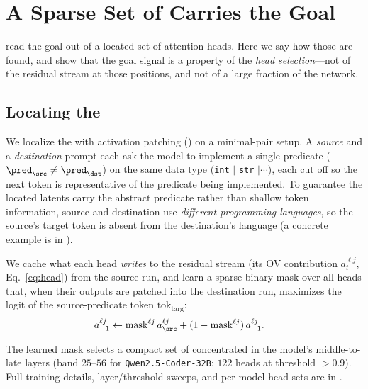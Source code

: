 \section{A Sparse Set of \goalheads Carries the Goal}
\label{sec:heads}

 read the goal out of a located set of attention heads. Here we say how those
\goalheads are found, and show that the goal signal is a property of the \emph{head selection}---not of
the residual stream at those positions, and not of a large fraction of the network.

\subsection{Locating the \goalheads}
\label{sec:heads:localize}

We localize the \goalheads with activation patching () on a
minimal-pair setup. A \emph{source} and a \emph{destination} prompt each ask the model to implement a
single predicate ($\pred_\src \neq \pred_\dst$) on the same data type (\texttt{int} $\mid$ \texttt{str}
$\mid \cdots$), each cut off so the next token is representative of the predicate being implemented. To
guarantee the located latents carry the abstract predicate rather than shallow token information, source
and destination use \emph{different programming languages}, so the source's target token is absent from
the destination's language (a concrete example is in {\color{red}}).

We cache what each head \emph{writes} to the residual stream (its OV contribution $a_t^{\ell j}$,
Eq.~\ref{eq:head}) from the source run, and learn a sparse binary mask over all heads that, when their
outputs are patched into the destination run, maximizes the logit of the source-predicate token
$\mathrm{tok}_\mathrm{targ}$:
\vspace{-1.0em}
\begin{align}
    \label{eqn:opt-int}
    a^{\ell j}_{-1} & \leftarrow \mathrm{mask}^{\ell j}\, a^{\ell j}_{\src} + (1 - \mathrm{mask}^{\ell j})\, a^{\ell j}_{-1}.
\end{align}
\vspace{-1.5em}

The learned mask selects a compact set of \goalheads concentrated in the model's middle-to-late layers
(band $25$--$56$ for \texttt{Qwen2.5-Coder-32B}; $122$ heads at threshold $>0.9$). Full training details,
layer/threshold sweeps, and per-model head sets are in .

